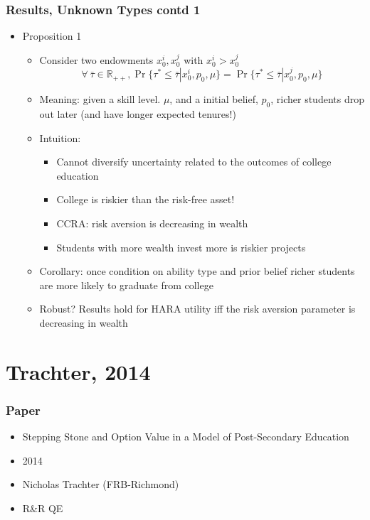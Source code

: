 \begin{frame}
	\frametitle{Results, Unknown Types contd 1}
		\begin{itemize}
			\item Proposition 1
				\begin{itemize}
					\item Consider two endowments $x_{0}^i, x_{0}^j$ with $x_{0}^i > x_{0}^j$
					\begin{equation}
					\forall \ \bar{\tau} \in \mathbb{R}_{++}, \Pr \{ \tau^* \leq \bar{\tau} | x_{0}^i, p_{0}, \mu \} = \Pr \{ \tau^* \leq \bar{\tau} | x_{0}^j, p_{0}, \mu \}
					\end{equation}
					\item Meaning: given a skill level. $\mu$, and a initial belief, $p_{0}$, richer students drop out later (and have longer expected tenures!)
					\item Intuition:
						\begin{itemize}
							\item Cannot diversify uncertainty related to the outcomes of college education
							\item College is riskier than the risk-free asset!
							\item CCRA: risk aversion is decreasing in wealth
							\item Students with more wealth invest more is riskier projects
						\end{itemize}
					\item Corollary: once condition on ability type and prior belief richer students are more likely to graduate from college
					\item Robust? Results hold for HARA utility iff the risk aversion parameter is decreasing in wealth
				\end{itemize}
		\end{itemize}
\end{frame}

\section{Trachter, 2014}

\begin{frame}
	\frametitle{Paper}
		\begin{itemize}
			\item Stepping Stone and Option Value in a Model of Post-Secondary Education
			\item 2014
			\item Nicholas Trachter (FRB-Richmond)
			\item R\&R QE
		\end{itemize}
\end{frame}

